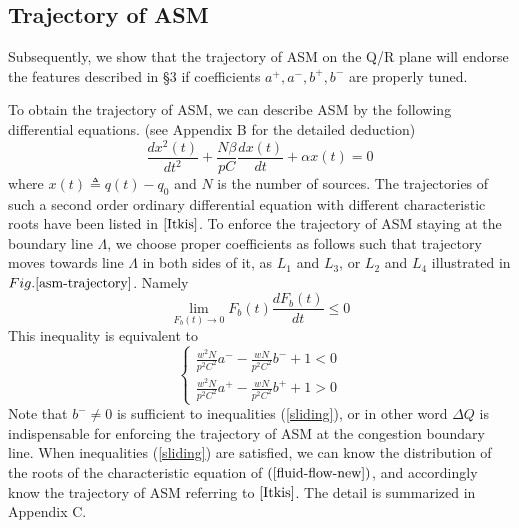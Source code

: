 \documentclass{sig-alternate-10pt}
\def\figurename{Fig.}
\begin{document}
\subsection{Trajectory of ASM}
Subsequently, we show that the trajectory of ASM on the Q/R plane will endorse the features described in \S3 if coefficients $a^+, a^-, b^+, b^-$ are properly tuned.

To obtain the trajectory of ASM, we can describe ASM by the following differential equations. (see Appendix B for the detailed deduction)
\begin{equation}
\frac{dx^2(t)}{dt^2}+\frac{N\beta}{pC}\frac{dx(t)}{dt}+\alpha x(t)=0
\label{fluid-flow-new}
\end{equation}
where $x(t)\triangleq q(t)-q_0$ and $N$ is the number of sources. The trajectories of such a second order ordinary differential equation with different characteristic roots have been listed in $\cite{Itkis}$. To enforce the trajectory of ASM staying at the boundary line $\Lambda$, we choose proper coefficients as follows such that trajectory moves towards line $\Lambda$ in both sides of it, as $L_1$ and $L_3$, or $L_2$ and $L_4$ illustrated in $\figurename{\ref{asm-trajectory}}$. Namely
\begin{equation}
\lim\limits_{F_b(t)\rightarrow 0}^{}F_b(t)\frac{dF_b(t)}{dt}\leq 0
\label{smm-condition}
\end{equation}
This inequality is equivalent to 
\begin{equation}
\left \{ \begin{array}{ll}
\frac{w^2N}{p^2C^2}a^--\frac{wN}{p^2C^2}b^-+1< 0 \\
\frac{w^2N}{p^2C^2}a^+-\frac{wN}{p^2C^2}b^++1> 0
\end{array}
\right.
\label{sliding}
\end{equation}
Note that $b^-\neq0$ is sufficient to inequalities (\ref{sliding}), or in other word $\Delta Q$ is indispensable for enforcing the trajectory of ASM at the congestion boundary line. When inequalities (\ref{sliding}) are satisfied, we can know the distribution of the roots of the characteristic equation of $(\ref{fluid-flow-new})$, and accordingly know the trajectory of ASM referring to $\cite{Itkis}$. The detail is summarized in Appendix C. 
\end{document}

